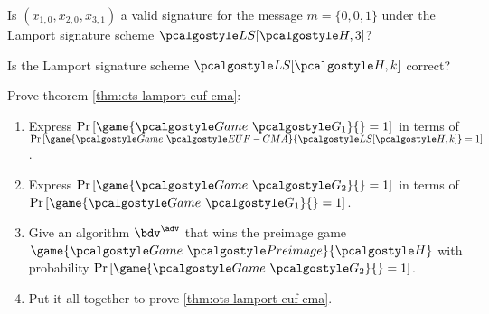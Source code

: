 \begin{exercise}
  Is $(x_{1,0}, x_{2,0}, x_{3,1})$ a valid signature for the message $m = \{0, 0, 1\}$ under the Lamport signature scheme $\algo{LS}[\algo{H, 3}]$?
\end{exercise}

\begin{exercise}
  Is the Lamport signature scheme $\algo{LS}[\algo{H, k}]$ correct?
\end{exercise}

\begin{exercise}
  Prove theorem \autoref{thm:ots-lamport-euf-cma}:
  \begin{enumerate}
      \item Express $\pr{\game{\Game~\algo{G_1}}{} = 1}$ in terms of $\pr{\game{\Game~\algo{EUF-CMA}}{\algo{LS[\algo{H}, k]}} = 1}$.
      \item Express $\pr{\game{\Game~\algo{G_2}}{} = 1}$ in terms of $\pr{\game{\Game~\algo{G_1}}{} = 1}$.
      \item Give an algorithm $\bdv^\adv$ that wins the preimage game $\game{\Game~\algo{Preimage}}{\algo{H}}$ with probability $\pr{\game{\Game~\algo{G_2}}{} = 1}$.
      \item Put it all together to prove \autoref{thm:ots-lamport-euf-cma}.
  \end{enumerate}
\end{exercise}

